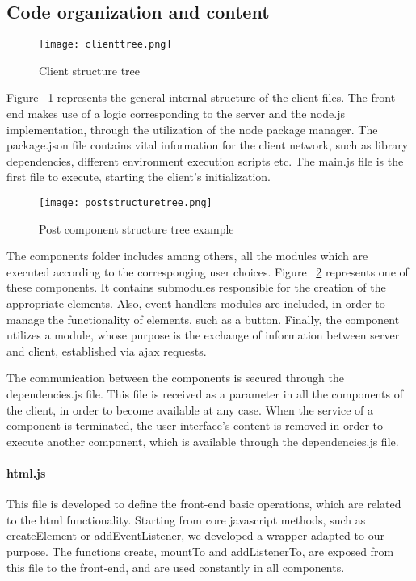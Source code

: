 \subsection{Code organization and content}
\begin{figure}
	\centerline{\texttt{[image: clienttree.png]}}
	\caption{Client structure tree}
	\label{clienttree}
\end{figure}
Figure ~\ref{clienttree} represents the general internal structure of the client files. The front-end makes use of a logic corresponding to the server and the node.js implementation, through the utilization of the node package manager. The package.json file contains vital information for the client network, such as library dependencies, different environment execution scripts etc. The main.js file is the first file to execute, starting the client's initialization. \par 
\begin{figure}
	\centerline{\texttt{[image: poststructuretree.png]}}
	\caption{Post component structure tree example}
	\label{poststructuretree}
\end{figure}
	The components folder includes among others, all the modules which are executed according to the corresponging user choices. Figure ~\ref{poststructuretree} represents one of these components. It contains submodules responsible for the creation of the appropriate elements. Also, event handlers modules are included, in order to manage the functionality of elements, such as a button. Finally, the component utilizes a module, whose purpose is the exchange of information between server and client, established via ajax requests.\par
	The communication between the components is secured through the dependencies.js file. This file is received as a parameter in all the components of the client, in order to become available at any case. When the service of a component is terminated, the user interface's content is removed in order to execute another component, which is available through the dependencies.js file.

\paragraph{html.js}
This file is developed to define the front-end basic operations, which are related to the html functionality. Starting from core javascript methods, such as createElement or addEventListener, we developed a wrapper adapted to our purpose. The functions create, mountTo and addListenerTo, are exposed from this file to the front-end, and are used constantly in all components. 


